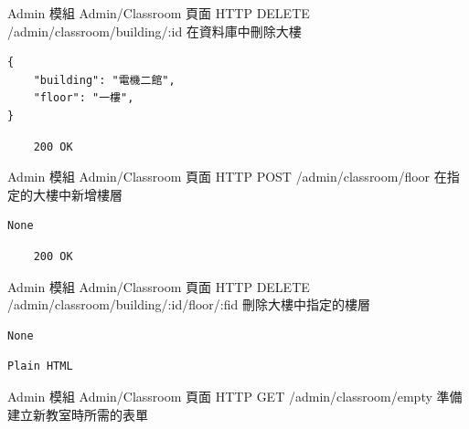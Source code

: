 \documentclass{article}
\begin{document}
{Admin 模組}
{Admin/Classroom 頁面}
{HTTP DELETE}
{/admin/classroom/building/:id}
{在資料庫中刪除大樓}

\bigskip

\begin{lrbox}{\jsoninputbox}
	\begin{lstlisting}[basicstyle=\tiny\ttfamily]
{
	"building": "電機二館",
	"floor": "一樓",
}
\end{lstlisting}
\end{lrbox}

\begin{lrbox}{\jsonoutputbox}
	\begin{lstlisting}
	200 OK
\end{lstlisting}
\end{lrbox}

{Admin 模組}
{Admin/Classroom 頁面}
{HTTP POST}
{/admin/classroom/floor}
{在指定的大樓中新增樓層}

\bigskip

\begin{lrbox}{\jsoninputbox}
	\begin{lstlisting}
None
\end{lstlisting}
\end{lrbox}

\begin{lrbox}{\jsonoutputbox}
	\begin{lstlisting}
	200 OK
\end{lstlisting}
\end{lrbox}

{Admin 模組}
{Admin/Classroom 頁面}
{HTTP DELETE}
{/admin/classroom/building/:id/floor/:fid}
{刪除大樓中指定的樓層}

\bigskip

\begin{lrbox}{\jsoninputbox}
	\begin{lstlisting}
None
\end{lstlisting}
\end{lrbox}

\begin{lrbox}{\jsonoutputbox}
	\begin{lstlisting}
Plain HTML
\end{lstlisting}
\end{lrbox}

{Admin 模組}
{Admin/Classroom 頁面}
{HTTP GET}
{/admin/classroom/empty}
{準備建立新教室時所需的表單}

\bigskip
\end{document}
